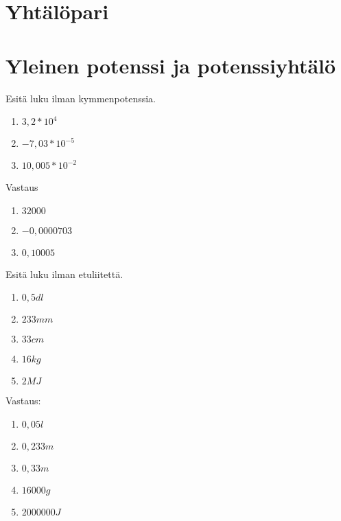 \chapter{Yhtälöpari}


\chapter{Yleinen potenssi ja potenssiyhtälö}

\begin{tehtava}
Esitä luku ilman kymmenpotenssia.
\begin{enumerate}
\item $3,2 * 10^4$
\item $-7,03 * 10^{-5}$
\item $10,005 * 10^{-2}$
\end{enumerate}
\begin{vastaus}
Vastaus
\begin{enumerate}
\item $32000$
\item $-0,0000703$
\item $0,10005$
\end{enumerate}
\end{vastaus}
\end{tehtava}

\begin{tehtava}
Esitä luku ilman etuliitettä.
\begin{enumerate}
\item $0,5 dl$
\item $233 mm$
\item $33 cm$
\item $16 kg$
\item $2 MJ$
\end{enumerate}
\begin{vastaus}
Vastaus:
\begin{enumerate}
\item $0,05 l$
\item $0,233 m$
\item $0,33 m$
\item $16 000 g$
\item $2 000 000 J$
\end{enumerate}
\end{vastaus}
\end{tehtava}


